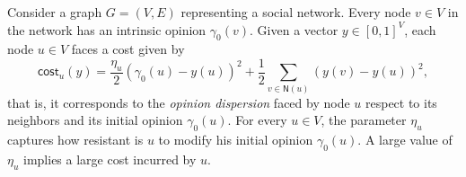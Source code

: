 \documentclass[letterpaper,11pt]{article}
\newcommand{\ZZ}{\mathbb{Z}}
\newcommand{\nsf}{\mathsf{N}}
\newcommand{\cost}{\mathsf{cost}}
\newcommand{\degsf}{\mathsf{deg}}
\newcommand{\vvcom}[1]{\todo[color=red!25!white]{Victor: #1}}
\begin{document}
Consider a graph $G=(V,E)$ representing a social network.
Every node $v\in V$ in the network has an intrinsic opinion $\gamma_0(v)$.
Given a vector $y\in [0,1]^V$, each node $u\in V$ faces a cost given by 
\begin{equation}
\cost_u(y)=\frac{\eta_u}{2}(\gamma_0(u)-y(u))^2+ \frac{1}{2} \sum_{v\in \nsf(u)}(y(v)-y(u))^2,
\end{equation} 
that is, it corresponds to the {\it opinion dispersion} faced by node $u$ respect to its neighbors and its initial opinion $\gamma_0(u)$. 
For every $u\in V$, the parameter $\eta_u$ captures how resistant is $u$ to modify his initial opinion $\gamma_0(u)$.
A large value of $\eta_u$ implies a large cost incurred by $u$.\\
\end{document}

